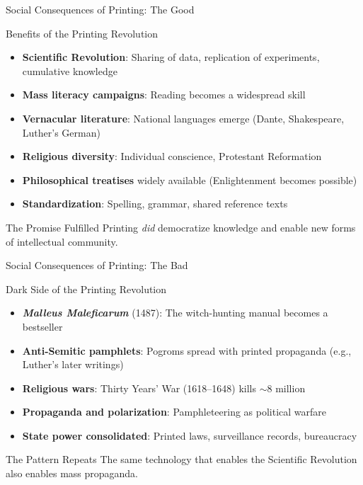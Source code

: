 \documentclass[aspectratio=169]{beamer}
\begin{document}
\begin{frame}{Social Consequences of Printing: The Good}
\begin{block}{\faThumbsUp\hspace{0.3em}Benefits of the Printing Revolution}
\begin{itemize}
  \item \textbf{Scientific Revolution}: Sharing of data, replication of experiments, cumulative knowledge
  \item \textbf{Mass literacy campaigns}: Reading becomes a widespread skill
  \item \textbf{Vernacular literature}: National languages emerge (Dante, Shakespeare, Luther's German)
  \item \textbf{Religious diversity}: Individual conscience, Protestant Reformation
  \item \textbf{Philosophical treatises} widely available (Enlightenment becomes possible)
  \item \textbf{Standardization}: Spelling, grammar, shared reference texts
\end{itemize}
\end{block}

\vspace{0.3em}
\begin{exampleblock}{The Promise Fulfilled}
Printing \textit{did} democratize knowledge and enable new forms of intellectual community.
\end{exampleblock}
\end{frame}

\begin{frame}{Social Consequences of Printing: The Bad}
\begin{alertblock}{\faThumbsDown\hspace{0.3em}Dark Side of the Printing Revolution}
\begin{itemize}
  \item \textbf{\textit{Malleus Maleficarum}} (1487): The witch-hunting manual becomes a bestseller
  \item \textbf{Anti-Semitic pamphlets}: Pogroms spread with printed propaganda (e.g., Luther's later writings)
  \item \textbf{Religious wars}: Thirty Years' War (1618--1648) kills $\sim$8 million
  \item \textbf{Propaganda and polarization}: Pamphleteering as political warfare
  \item \textbf{State power consolidated}: Printed laws, surveillance records, bureaucracy
\end{itemize}
\end{alertblock}

\vspace{0.3em}

\vspace{0.3em}
\begin{block}{The Pattern Repeats}
The same technology that enables the Scientific Revolution also enables mass propaganda.
\end{block}
\end{frame}
\end{document}
